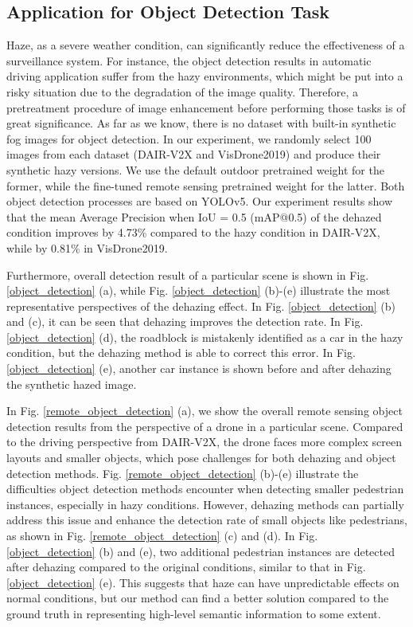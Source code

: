 \documentclass[lettersize,journal]{IEEEtran}
\begin{document}
\subsection{Application for Object Detection Task}
Haze, as a severe weather condition, can significantly reduce the effectiveness of a surveillance system. For instance, the object detection results in automatic driving application suffer from the hazy environments, which might be put into a risky situation due to the degradation of the image quality. Therefore, a pretreatment procedure of image enhancement before performing those tasks is of great significance. As far as we know, there is no dataset with built-in synthetic fog images for object detection. In our experiment, we randomly select 100 images from each dataset (DAIR-V2X and VisDrone2019) and produce their synthetic hazy versions. We use the default outdoor pretrained weight for the former, while the fine-tuned remote sensing pretrained weight for the latter. Both object detection processes are based on YOLOv5. Our experiment results show that the mean Average Precision when IoU = 0.5 (mAP@0.5) of the dehazed condition improves by 4.73\% compared to the hazy condition in DAIR-V2X, while by 0.81\% in VisDrone2019.

Furthermore, overall detection result of a particular scene is shown in Fig. \ref{object_detection} (a), while Fig. \ref{object_detection} (b)-(e) illustrate the most representative perspectives of the dehazing effect. In Fig. \ref{object_detection} (b) and (c), it can be seen that dehazing improves the detection rate. In Fig. \ref{object_detection} (d), the roadblock is mistakenly identified as a car in the hazy condition, but the dehazing method is able to correct this error. In Fig. \ref{object_detection} (e), another car instance is shown before and after dehazing the synthetic hazed image. 

In Fig. \ref{remote_object_detection} (a), we show the overall remote sensing object detection results from the perspective of a drone in a particular scene. Compared to the driving perspective from DAIR-V2X, the drone faces more complex screen layouts and smaller objects, which pose challenges for both dehazing and object detection methods. Fig. \ref{remote_object_detection} (b)-(e) illustrate the difficulties object detection methods encounter when detecting smaller pedestrian instances, especially in hazy conditions. However, dehazing methods can partially address this issue and enhance the detection rate of small objects like pedestrians, as shown in Fig. \ref{remote_object_detection} (c) and (d). In Fig. \ref{object_detection} (b) and (e), two additional pedestrian instances are detected after dehazing compared to the original conditions, similar to that in Fig. \ref{object_detection} (e). This suggests that haze can have unpredictable effects on normal conditions, but our method can find a better solution compared to the ground truth in representing high-level semantic information to some extent.
\end{document}

